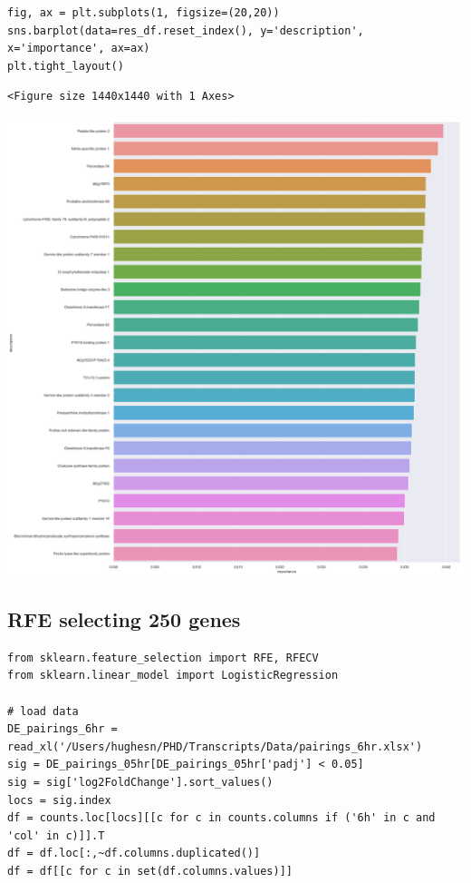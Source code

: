 \documentclass[11pt]{article}
\begin{document}
\begin{verbatim}
fig, ax = plt.subplots(1, figsize=(20,20))
sns.barplot(data=res_df.reset_index(), y='description', x='importance', ax=ax)
plt.tight_layout()
\end{verbatim}

\begin{verbatim}
<Figure size 1440x1440 with 1 Axes>
\end{verbatim}


\begin{center}
\includegraphics[width=.9\linewidth]{obipy-resources/93e2fbf76ed477962282ae99767b8408de4d3ed9/fc0850005c3f274f6f9419db2a2819926e16f06e.png}
\end{center}


\subsection{RFE selecting 250 genes}
\label{sec:org8232402}
\begin{verbatim}
from sklearn.feature_selection import RFE, RFECV
from sklearn.linear_model import LogisticRegression

# load data
DE_pairings_6hr = read_xl('/Users/hughesn/PHD/Transcripts/Data/pairings_6hr.xlsx')
sig = DE_pairings_05hr[DE_pairings_05hr['padj'] < 0.05]
sig = sig['log2FoldChange'].sort_values()
locs = sig.index
df = counts.loc[locs][[c for c in counts.columns if ('6h' in c and 'col' in c)]].T
df = df.loc[:,~df.columns.duplicated()]
df = df[[c for c in set(df.columns.values)]]
\end{verbatim}
\end{document}
